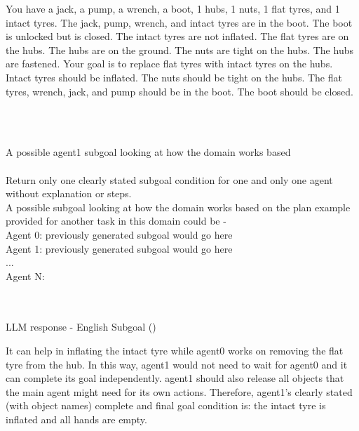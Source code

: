 \begin{tcolorbox}[redbox]
\begin{minipage}{0.95\columnwidth}
You have a jack, a pump, a wrench, a boot, 1 hubs, 1 nuts, 1 flat tyres, and 1 intact tyres. 
The jack, pump, wrench, and intact tyres are in the boot. 
The boot is unlocked but is closed. 
The intact tyres are not inflated. 
The flat tyres are on the hubs. 
The hubs are on the ground. 
The nuts are tight on the hubs. 
The hubs are fastened. 
Your goal is to replace flat tyres with intact tyres on the hubs. Intact tyres should be inflated. The nuts should be tight on the hubs. The flat tyres, wrench, jack, and pump should be in the boot. The boot should be closed.
\end{minipage}
\end{tcolorbox} \\ \\
\begin{tcolorbox}[redbox]
\begin{minipage}{0.95\columnwidth}
A possible agent1 subgoal looking at how the domain works based \\ \\
Return only one clearly stated subgoal condition for one and only one agent without explanation or steps. \\A possible subgoal looking at how the domain works based on the plan example provided for another task in this domain could be - \\ 
Agent 0: {previously generated subgoal would go here}\\
Agent 1: {previously generated subgoal would go here}
\\...\\
Agent N: 
\end{minipage}
\end{tcolorbox} \\ \\
LLM response - English Subgoal (\tyre) \\
\begin{tcolorbox}[greenbox]
\begin{minipage}{0.95\columnwidth}
 It can help in inflating the intact tyre while agent0 works on removing the flat tyre from the hub. In this way, agent1 would not need to wait for agent0 and it can complete its goal independently. agent1 should also release all objects that the main agent might need for its own actions. Therefore, agent1's clearly stated (with object names) complete and final goal condition is: the intact tyre is inflated and all hands are empty.
\end{minipage}
\end{tcolorbox} \\ \\ \\

